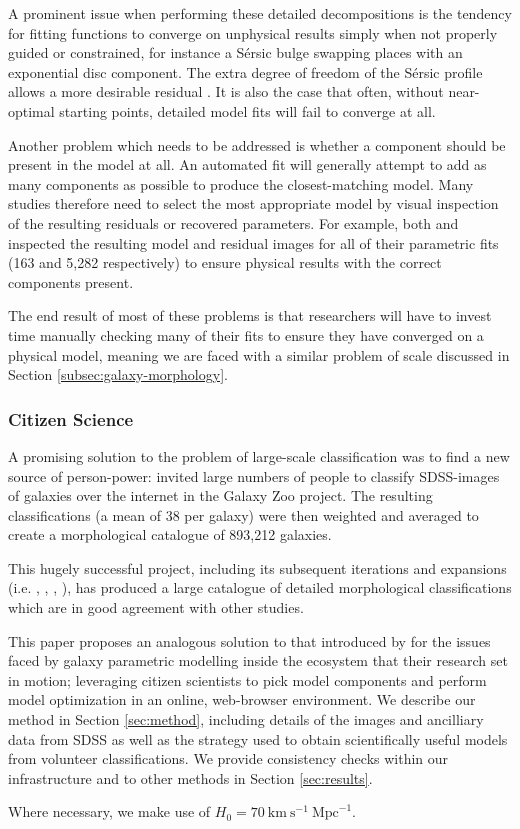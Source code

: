\documentclass[../main.tex]{subfiles}
\begin{document}
A prominent issue when performing these detailed decompositions is the tendency for fitting functions to converge on unphysical results simply when not properly guided or constrained, for instance a S\'ersic bulge swapping places with an exponential disc component. The extra degree of freedom of the S\'ersic profile allows a more desirable residual \citep{2017MNRAS.469.3363K}. It is also the case that often, without near-optimal starting points, detailed model fits will fail to converge at all.

Another problem which needs to be addressed is whether a component should be present in the model at all. An automated fit will generally attempt to add as many components as possible to produce the closest-matching model. Many studies therefore need to select the most appropriate model by visual inspection of the resulting residuals or recovered parameters. For example, both \citet{Vika2014:1408.4070v1} and \citet{2018MNRAS.473.4731K} inspected the resulting model and residual images for all of their parametric fits (163 and 5,282 respectively) to ensure physical results with the correct components present.

The end result of most of these problems is that researchers will have to invest time manually checking many of their fits to ensure they have converged on a physical model, meaning we are faced with a similar problem of scale discussed in Section \ref{subsec:galaxy-morphology}.


\subsubsection{Citizen Science}

A promising solution to the problem of large-scale classification was to find a new source of person-power: \cite{Lintott2008:0804.4483v1} invited large numbers of people to classify SDSS-images of galaxies over the internet in the Galaxy Zoo project. The resulting classifications (a mean of 38 per galaxy) were then weighted and averaged to create a morphological catalogue of 893,212 galaxies.

This hugely successful project, including its subsequent iterations and expansions (i.e. \citealt{Willett2013:1308.3496v2}, \citealt{2017MNRAS.464.4176W}, \citealt{2017MNRAS.464.4420S}, \citealt{Hart2016:1607.01019v1}), has produced a large catalogue of detailed morphological classifications which are in good agreement with other studies.

This paper proposes an analogous solution to that introduced by \cite{Lintott2008:0804.4483v1} for the issues faced by galaxy parametric modelling inside the ecosystem that their research set in motion; leveraging citizen scientists to pick model components and perform model optimization in an online, web-browser environment. We describe our method in Section \ref{sec:method}, including details of the images and ancilliary data from SDSS as well as the strategy used to obtain scientifically useful models from volunteer classifications. We provide consistency checks within our infrastructure and to other methods in Section \ref{sec:results}.

Where necessary, we make use of $H_0 = 70\ \text{km}\ \text{s}^{-1}\ \text{Mpc}^{-1}$.
\end{document}
